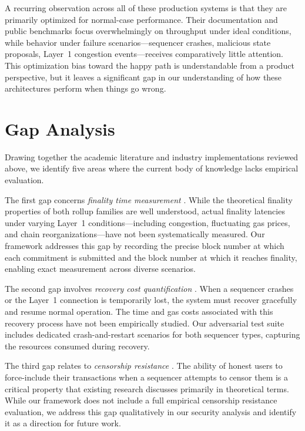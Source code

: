 \documentclass[
]{elteikthesis}[2024/04/26]
\begin{document}
A recurring observation across all of these production systems is that they are primarily optimized for normal-case performance. Their documentation and public benchmarks focus overwhelmingly on throughput under ideal conditions, while behavior under failure scenarios---sequencer crashes, malicious state proposals, Layer~1 congestion events---receives comparatively little attention. This optimization bias toward the happy path is understandable from a product perspective, but it leaves a significant gap in our understanding of how these architectures perform when things go wrong.

\section{Gap Analysis}

Drawing together the academic literature and industry implementations reviewed above, we identify five areas where the current body of knowledge lacks empirical evaluation.

The first gap concerns \textit{finality time measurement} \label{gap:finality}. While the theoretical finality properties of both rollup families are well understood, actual finality latencies under varying Layer~1 conditions---including congestion, fluctuating gas prices, and chain reorganizations---have not been systematically measured. Our framework addresses this gap by recording the precise block number at which each commitment is submitted and the block number at which it reaches finality, enabling exact measurement across diverse scenarios.

The second gap involves \textit{recovery cost quantification} \label{gap:recovery}. When a sequencer crashes or the Layer~1 connection is temporarily lost, the system must recover gracefully and resume normal operation. The time and gas costs associated with this recovery process have not been empirically studied. Our adversarial test suite includes dedicated crash-and-restart scenarios for both sequencer types, capturing the resources consumed during recovery.

The third gap relates to \textit{censorship resistance} \label{gap:censorship}. The ability of honest users to force-include their transactions when a sequencer attempts to censor them is a critical property that existing research discusses primarily in theoretical terms. While our framework does not include a full empirical censorship resistance evaluation, we address this gap qualitatively in our security analysis and identify it as a direction for future work.
\end{document}
